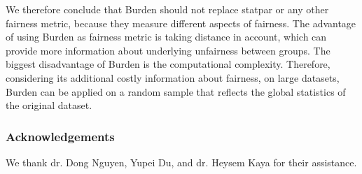 \documentclass[runningheads]{llncs}
\begin{document}
We therefore conclude that \gls{Burden} should not replace \gls{statpar} or any other fairness metric, because they measure  different aspects of fairness. The advantage of using \gls{Burden} as fairness metric is taking distance in account, which can provide more information about underlying unfairness between groups. The biggest disadvantage of \gls{Burden} is the computational complexity. Therefore, considering its additional costly information about fairness, on large datasets, Burden can be applied on a random sample that reflects the global statistics of the original dataset.

\subsubsection*{Acknowledgements} We thank dr. Dong Nguyen, Yupei Du, and dr. Heysem Kaya for their assistance.



\end{document}

